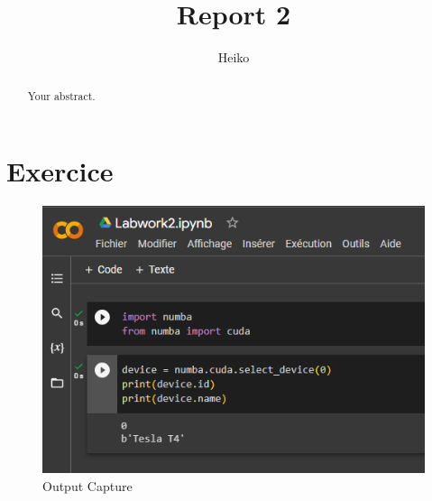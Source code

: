 \documentclass{article}
\title{Report 2}
\author{Heiko}
\begin{document}
\maketitle

\begin{abstract}
Your abstract.
\end{abstract}

\section{Exercice}

\begin{figure}[h]
\centering
\includegraphics[width=0.5\linewidth]{Images/labwork2.PNG}
\caption{\label{fig:labwork2}Output Capture}
\end{figure}
\end{document}
